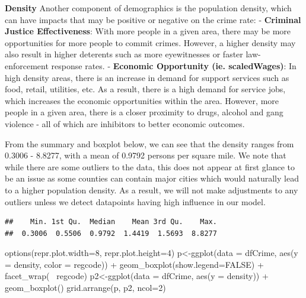 \documentclass[]{article}
\newenvironment{Shaded}{}{}
\newcommand{\DataTypeTok}[1]{#1}
\newcommand{\DecValTok}[1]{#1}
\newcommand{\KeywordTok}[1]{\textcolor[rgb]{0.00,0.00,1.00}{#1}}
\newcommand{\NormalTok}[1]{#1}
\newcommand{\OperatorTok}[1]{#1}
\newcommand{\OtherTok}[1]{\textcolor[rgb]{1.00,0.25,0.00}{#1}}
\newcommand{\StringTok}[1]{\textcolor[rgb]{0.00,0.50,0.50}{#1}}
\begin{document}
\textbf{Density} Another component of demographics is the population
density, which can have impacts that may be positive or negative on the
crime rate: - \textbf{Criminal Justice Effectiveness}: With more people
in a given area, there may be more opportunities for more people to
commit crimes. However, a higher density may also result in higher
deterents such as more eyewitnesses or faster law-enforcement response
rates. - \textbf{Economic Opportunity (ie. scaledWages)}: In high
density areas, there is an increase in demand for support services such
as food, retail, utilities, etc. As a result, there is a high demand for
service jobs, which increases the economic opportunities within the
area. However, more people in a given area, there is a closer proximity
to drugs, alcohol and gang violence - all of which are inhibitors to
better economic outcomes.

From the summary and boxplot below, we can see that the density ranges
from 0.3006 - 8.8277, with a mean of 0.9792 persons per square mile. We
note that while there are some outliers to the data, this does not
appear at first glance to be an issue as some counties can contain major
cities which would naturally lead to a higher population density. As a
result, we will not make adjustments to any outliers unless we detect
datapoints having high influence in our model.

\begin{Shaded}
\end{Shaded}

\begin{verbatim}
##    Min. 1st Qu.  Median    Mean 3rd Qu.    Max. 
##  0.3006  0.5506  0.9792  1.4419  1.5693  8.8277
\end{verbatim}

\begin{Shaded}
\begin{Highlighting}[]
\KeywordTok{options}\NormalTok{(}\DataTypeTok{repr.plot.width=}\DecValTok{8}\NormalTok{, }\DataTypeTok{repr.plot.height=}\DecValTok{4}\NormalTok{)}
\NormalTok{p<-}\KeywordTok{ggplot}\NormalTok{(}\DataTypeTok{data =}\NormalTok{ dfCrime, }\KeywordTok{aes}\NormalTok{(}\DataTypeTok{y =}\NormalTok{ density, }\DataTypeTok{color =}\NormalTok{ regcode)) }\OperatorTok{+}\StringTok{ }
\StringTok{     }\KeywordTok{geom_boxplot}\NormalTok{(}\DataTypeTok{show.legend=}\OtherTok{FALSE}\NormalTok{) }\OperatorTok{+}\StringTok{ }\KeywordTok{facet_wrap}\NormalTok{(}\OperatorTok{~}\StringTok{ }\NormalTok{regcode)}
\NormalTok{p2<-}\KeywordTok{ggplot}\NormalTok{(}\DataTypeTok{data =}\NormalTok{ dfCrime, }\KeywordTok{aes}\NormalTok{(}\DataTypeTok{y =}\NormalTok{ density)) }\OperatorTok{+}
\StringTok{     }\KeywordTok{geom_boxplot}\NormalTok{()}
\KeywordTok{grid.arrange}\NormalTok{(p, p2, }\DataTypeTok{ncol=}\DecValTok{2}\NormalTok{)}
\end{Highlighting}
\end{Shaded}
\end{document}
